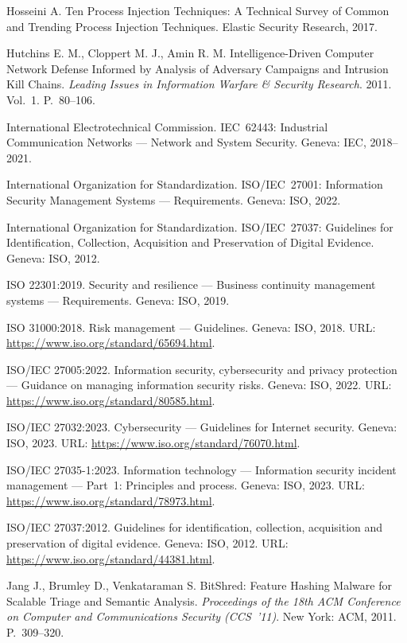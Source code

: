  Hosseini A. Ten Process Injection Techniques: A Technical Survey of Common and Trending Process Injection Techniques. Elastic Security Research, 2017.

 Hutchins E. M., Cloppert M. J., Amin R. M. Intelligence-Driven Computer Network Defense Informed by Analysis of Adversary Campaigns and Intrusion Kill Chains. \emph{Leading Issues in Information Warfare \& Security Research}. 2011. Vol.~1. P.~80--106.

 International Electrotechnical Commission. IEC~62443: Industrial Communication Networks --- Network and System Security. Geneva: IEC, 2018--2021.

 International Organization for Standardization. ISO/IEC~27001: Information Security Management Systems --- Requirements. Geneva: ISO, 2022.

 International Organization for Standardization. ISO/IEC~27037: Guidelines for Identification, Collection, Acquisition and Preservation of Digital Evidence. Geneva: ISO, 2012.

 ISO 22301:2019. Security and resilience --- Business continuity management systems --- Requirements. Geneva: ISO, 2019.

 ISO 31000:2018. Risk management --- Guidelines. Geneva: ISO, 2018. URL: \url{https://www.iso.org/standard/65694.html}.

 ISO/IEC 27005:2022. Information security, cybersecurity and privacy protection --- Guidance on managing information security risks. Geneva: ISO, 2022. URL: \url{https://www.iso.org/standard/80585.html}.

 ISO/IEC 27032:2023. Cybersecurity --- Guidelines for Internet security. Geneva: ISO, 2023. URL: \url{https://www.iso.org/standard/76070.html}.

 ISO/IEC 27035-1:2023. Information technology --- Information security incident management --- Part~1: Principles and process. Geneva: ISO, 2023. URL: \url{https://www.iso.org/standard/78973.html}.

 ISO/IEC 27037:2012. Guidelines for identification, collection, acquisition and preservation of digital evidence. Geneva: ISO, 2012. URL: \url{https://www.iso.org/standard/44381.html}.

 Jang J., Brumley D., Venkataraman S. BitShred: Feature Hashing Malware for Scalable Triage and Semantic Analysis. \emph{Proceedings of the 18th ACM Conference on Computer and Communications Security (CCS~'11)}. New York: ACM, 2011. P.~309--320.


